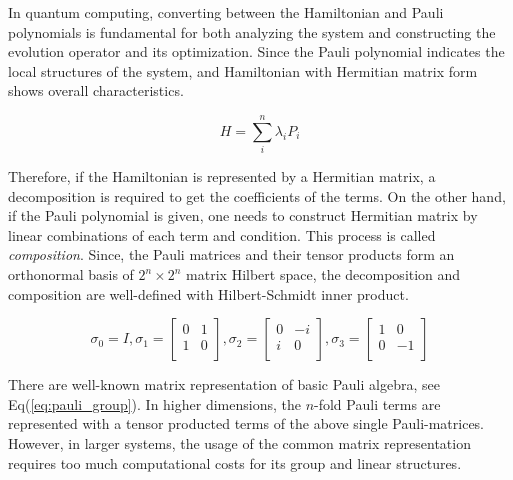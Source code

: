 \documentclass[twocolumn]{article}
\begin{document}
In quantum computing, converting between the Hamiltonian and Pauli polynomials is fundamental 
for both analyzing the system and constructing the evolution operator and its optimization.
Since the Pauli polynomial indicates the local structures of the system,
and Hamiltonian with Hermitian matrix form shows overall characteristics.

\begin{equation}
    H = \sum_i^n \lambda_i P_i
\end{equation}

Therefore, if the Hamiltonian is represented by a Hermitian matrix, 
a decomposition is required to get the coefficients of the terms. 
On the other hand, if the Pauli polynomial is given, 
one needs to construct Hermitian matrix by linear combinations of each term and condition.
This process is called \textit{composition}.
Since, the Pauli matrices and their tensor products form an orthonormal basis 
of $2^n \times 2^n$ matrix Hilbert space\cite{nielsen2010quantum}, 
the decomposition and composition are well-defined with Hilbert-Schmidt inner product. 

\begin{equation}
    \label{eq:pauli_group}
    \sigma_0 = I, 
    \sigma_1 = \begin{bmatrix}
        0 & 1 \\
        1 & 0 \\
    \end{bmatrix},
    \sigma_2 = \begin{bmatrix}
        0 & -i \\
        i & 0 \\
    \end{bmatrix},
    \sigma_3 = \begin{bmatrix}
        1 & 0 \\
        0 & -1 \\
    \end{bmatrix}
\end{equation}

There are well-known matrix representation of basic Pauli algebra, see Eq(\ref{eq:pauli_group}).
In higher dimensions, the $n$-fold Pauli terms are represented with a tensor producted terms of the above single Pauli-matrices. 
However, in larger systems, the usage of the common matrix representation requires too much computational costs 
for its group and linear structures. 
\end{document}
